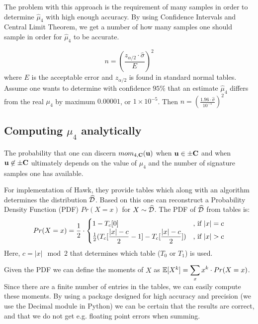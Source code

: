 The problem with this approach is the requirement of many samples in order to determine $\hat{\mu}_4$ with high enough accuracy.
By using Confidence Intervals and Central Limit Theorem, we get a number of how many samples one should sample in order for $\hat{\mu}_4$ to be accurate.

\[
    n = (\frac{z_{\alpha / 2} \cdot \hat{\sigma}}{E} )^2    
\]
where $E$ is the acceptable error and $z_{\alpha / 2}$ is found in standard normal tables.
Assume one wants to determine with confidence $95 \%$ that an estimate $\hat{\mu}_4$ differs from the real $\mu_4$ by maximum $0.00001$, or $1 \times 10^{-5}$.
Then $n = (\frac{1.96 \cdot \hat{\sigma}} {10^{-5}})^2$


\subsection{Computing $\mu_4$ analytically}
The probability that one can discern $mom_{4, \mathbf{C}}(\mathbf{u})$ when $\mathbf{u} \in \pm \mathbf{C}$ and when $\mathbf{u} \not\in \pm \mathbf{C}$ ultimately depends on the value of $\mu_4$ and the number of signature samples one has available.

For implementation of Hawk, they provide tables which along with an algorithm determines the distribution $\widehat{\mathcal{D}}$. Based on this one can reconstruct a Probability Density Function (PDF) $Pr(X = x)$ for $X \sim \widehat{\mathcal{D}}$.
The PDF of $\widehat{\mathcal{D}}$ from tables is:
\[
    Pr(X=x) = \frac{1}{2} \cdot
\begin{cases}
    1 - T_c[0] & \text{, if } \lvert x \rvert = c \\
    \frac{1}{2}\mathlarger{(T_c[\frac{\lvert x \rvert - c}{2} - 1] - T_c[\frac{\lvert x \rvert - c}{2}])} & \text{, if } \lvert x \rvert > c
\end{cases}
\]
Here, $c = \lvert x \rvert \mod{2}$ that determines which table ($T_0$ or $T_1$) is used. 

Given the PDF we can define the moments of $X$ as $\bb{E}[X^k] = \mathlarger{\sum_x x^k \cdot Pr(X = x)}$. Since there are a finite number of entries in the tables, we can easily compute these moments.
By using a package designed for high accuracy and precision (we use the Decimal module \cite{Decimal} in Python) we can be certain that the results are correct, and that we do not get e.g. floating point errors when summing.


